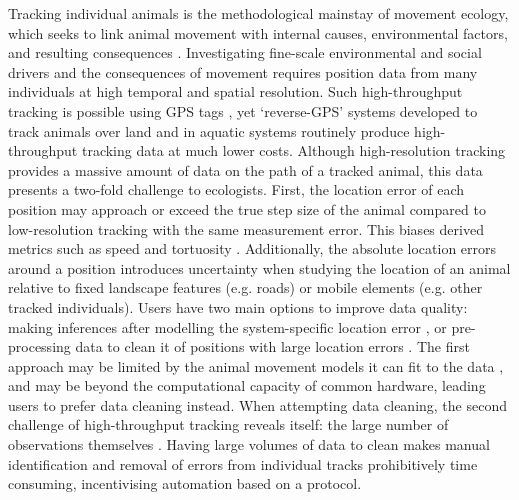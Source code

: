 \documentclass[10pt,paper=a4,headings=standardclasses
]{scrartcl}
\begin{document}
Tracking individual animals is the methodological mainstay of movement ecology, which seeks to link animal movement with internal causes, environmental factors, and resulting consequences \citep{nathan2008a, holyoak2008}. 
Investigating fine-scale environmental and social drivers and the consequences of movement requires position data from many individuals at high temporal and spatial resolution.
Such high-throughput tracking is possible using GPS tags \citep[see recent examples in][]{strandburg-peshkin2015, papageorgiou2019, harel2016}, yet ‘reverse-GPS’ systems developed to track animals over land \citep{toledo2014, weiser2016, toledo2016,toledo2020, maccurdy2009, maccurdy2019} and in aquatic systems \citep{hussey2015, baktoft2019, baktoft2017,jung2015, aspillaga2021} routinely produce high-throughput tracking data at much lower costs.
Although high-resolution tracking provides a massive amount of data on the path of a tracked animal, this data presents a two-fold challenge to ecologists.
First, the location error of each position may approach or exceed the true step size of the animal compared to low-resolution tracking with the same measurement error.
This biases derived metrics such as speed and tortuosity \citep[see][]{ranacher2016, noonan2019, hurford2009, calenge2009}.
Additionally, the absolute location errors around a position introduces uncertainty when studying the location of an animal relative to fixed landscape features (e.g. roads) or mobile elements (e.g. other tracked individuals).
Users have two main options to improve data quality: making inferences after modelling the system-specific location error \citep{fleming2014a, fleming2020, jonsen2003, jonsen2005, johnson2008, patterson2008,aspillaga2021}, or pre-processing data to clean it of positions with large location errors \citep{bjorneraas2010}.
The first approach may be limited by the animal movement models it can fit to the data \citep{fleming2014a, noonan2019, fleming2020}, and may be beyond the computational capacity of common hardware, leading users to prefer data cleaning instead.
When attempting data cleaning, the second challenge of high-throughput tracking reveals itself: the large number of observations themselves \citep{weiser2016, toledo2020}.
Having large volumes of data to clean makes manual identification and removal of errors from individual tracks prohibitively time consuming, incentivising automation based on a protocol.
\end{document}
